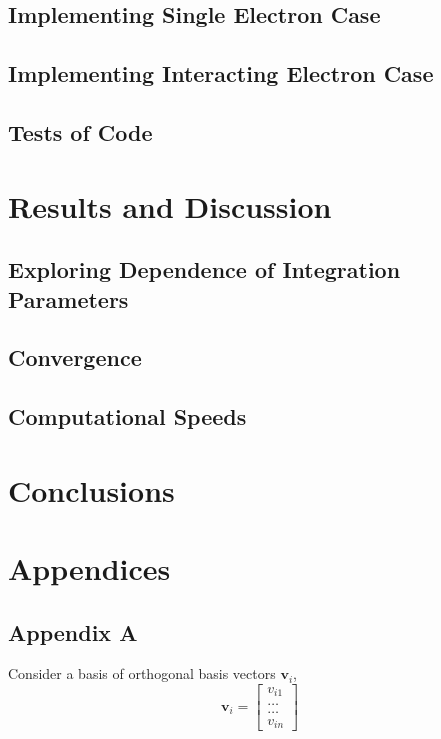 \documentclass[%
oneside,                 %
final,                   %
10pt]{article}
\begin{document}
\subsection{Implementing Single Electron Case}

\subsection{Implementing Interacting Electron Case}


\subsection{Tests of Code}


\section{Results and Discussion}


\subsection{Exploring Dependence of Integration Parameters}

\subsection{Convergence}


\subsection{Computational Speeds}


\section{Conclusions}



\section{Appendices}

\subsection{Appendix A} \label{A}

Consider a basis of orthogonal basis vectors $\mathbf{v}_i$,
\[
\mathbf{v}_i = \begin{bmatrix} v_{i1} \\ \dots \\ \dots \\v_{in} \end{bmatrix}
\]
\end{document}

